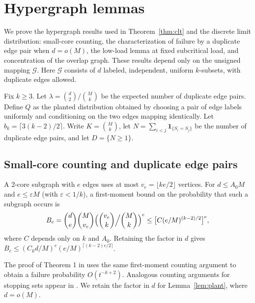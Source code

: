 \section{Hypergraph lemmas}\label{app:graph}
We prove the hypergraph results used in Theorem~\ref{thm:clt} and the discrete limit distribution: small-core counting, the characterization of failure by a duplicate edge pair when $d=o(M)$, the low-load lemma at fixed subcritical load, and concentration of the overlap graph. These results depend only on the unsigned mapping $\mathcal G$. Here $\mathcal G$ consists of $d$ labeled, independent, uniform $k$-subsets, with duplicate edges allowed.

Fix $k\ge3$. Let $\lambda=\binom d2/\binom Mk$ be the expected number of duplicate edge pairs. Define $Q$ as the planted distribution obtained by choosing a pair of edge labels uniformly and conditioning on the two edges mapping identically. Let $b_k=\lceil3(k-2)/2\rceil$. Write $K=\binom Mk$, let $N=\sum_{i<j}\mathbf1_{\{S_i=S_j\}}$ be the number of duplicate edge pairs, and let $D=\{N\ge1\}$.

\subsection{Small-core counting and duplicate edge pairs}
\begin{lemma}\label{lem:smallcore}
A 2-core subgraph with $e$ edges uses at most $v_e=\lfloor ke/2\rfloor$ vertices. For $d\le A_0M$ and $e\le\varepsilon M$ (with $\varepsilon<1/k$), a first-moment bound on the probability that such a subgraph occurs is
\begin{equation*}
B_e=\binom de\binom M{v_e}\Bigl(\binom{v_e}k\Big/\binom Mk\Bigr)^e\le\bigl[C(e/M)^{(k-2)/2}\bigr]^e,
\end{equation*}
where $C$ depends only on $k$ and $A_0$. Retaining the factor in $d$ gives $B_e\le(C_kd/M)^e(e/M)^{\lceil(k-2)e/2\rceil}$.
\end{lemma}

The proof of Theorem 1 in \cite{gm} uses the same first-moment counting argument to obtain a failure probability $O(t^{-k+2})$. Analogous counting arguments for stopping sets appear in \cite{yw,orlitsky2005stopping}. We retain the factor in $d$ for Lemma~\ref{lem:plant}, where $d=o(M)$.


